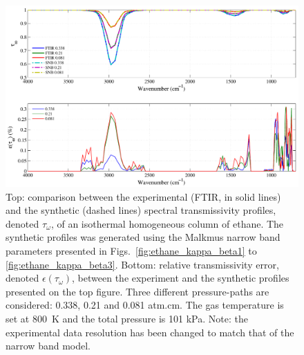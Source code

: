 \begin{figure}[p]
\includegraphics[width=\textwidth]{Figures/Comparison_Fit_Ethane_MALKMUS_Temp800K.pdf}
\caption{Top: comparison between the experimental (FTIR, in solid lines) and the synthetic (dashed lines) spectral transmissivity profiles, denoted $\tau_{\omega}$, of an isothermal homogeneous column of ethane. The synthetic profiles was generated using the Malkmus narrow band parameters presented in Figs.~\ref{fig:ethane_kappa_beta1} to \ref{fig:ethane_kappa_beta3}. Bottom: relative transmissivity error, denoted $\epsilon{(\tau_{\omega})}$, between the experiment and the synthetic profiles presented on the top figure. Three different pressure-paths are considered: 0.338, 0.21 and 0.081 atm.cm. The gas temperature is set at 800~K and the total pressure is 101 kPa. Note: the experimental data resolution has been changed to match that of the narrow band model. \label{fig:ethane_SNBVerify_800K}}
\end{figure}


